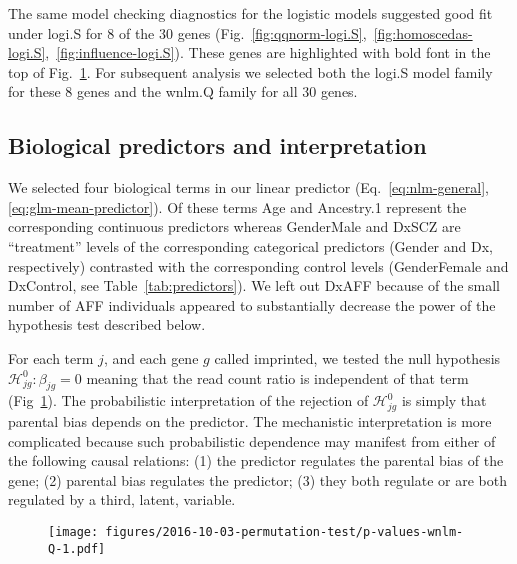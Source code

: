 \documentclass[letterpaper]{article}
\begin{document}
The same model checking diagnostics for the logistic models suggested good
fit under logi.S for 8 of the 30 genes
(Fig.~\ref{fig:qqnorm-logi.S},~\ref{fig:homoscedas-logi.S},~\ref{fig:influence-logi.S}).
These genes are highlighted with bold font in the top of Fig.~\ref{fig:pval-wnlm.Q}.
For subsequent analysis we selected both the logi.S model family for these 8
genes and the wnlm.Q family for all 30 genes.

\subsection{Biological predictors and interpretation}

We selected four biological terms in our linear predictor
(Eq.~\ref{eq:nlm-general}, \ref{eq:glm-mean-predictor}).  Of these terms Age
and Ancestry.1 represent the corresponding continuous predictors whereas
GenderMale and DxSCZ are “treatment” levels of the corresponding categorical
predictors (Gender and Dx, respectively) contrasted with the corresponding
control levels (GenderFemale and DxControl, see Table~\ref{tab:predictors}).
We left out DxAFF because of the small number of AFF individuals appeared to
substantially decrease the power of the hypothesis test described below.

For each term \(j\), and each gene \(g\) called imprinted, we tested the null
hypothesis \(\mathcal{H}^0_{jg} : \beta_{jg} = 0\) meaning that the read count
ratio is independent of that term (Fig~\ref{fig:pval-wnlm.Q}).  The
probabilistic interpretation of the rejection of \(\mathcal{H}^0_{jg}\) is
simply that parental bias depends on the predictor.  The
mechanistic interpretation is more complicated because such probabilistic
dependence may manifest from either of the following causal relations: (1) the
predictor regulates the parental bias of the gene; (2) parental bias regulates
the predictor; (3) they both regulate or are both regulated by a third,
latent, variable.

\begin{figure}
\begin{center}
\texttt{[image: figures/2016-10-03-permutation-test/p-values-wnlm-Q-1.pdf]}
\end{center}
\caption{}
\label{fig:pval-wnlm.Q}
\end{figure}
\end{document}
